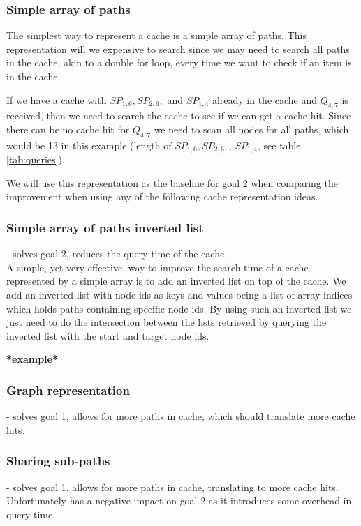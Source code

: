 \subsubsection{Simple array of paths}%
The simplest way to represent a cache is a simple array of paths. This representation will we expensive to search since we may need to search all paths in the cache, akin to a double for loop, every time we want to check if an item is in the cache.

If we have a cache with $SP_{1,6},SP_{2,6},$ and $SP_{1,4}$ already in the cache and $Q_{4,7}$ is received, then we need to search the cache to see if we can get a cache hit. Since there can be no cache hit for $Q_{4,7}$ we need to scan all nodes for all paths, which would be 13 in this example (length of $SP_{1,6},SP_{2,6},$, $SP_{1,4}$, see table \ref{tab:queries}).

We will use this representation as the baseline for goal 2 when comparing the improvement when using any of the following cache representation ideas.

\subsubsection{Simple array of paths inverted list} - solves goal 2, reduces the query time of the cache.\\
A simple, yet very effective, way to improve the search time of a cache represented by a simple array is to add an inverted list on top of the cache. We add an inverted list with node ids as keys and values being a list of array indices which holds paths containing specific node ids. By using such an inverted list we just need to do the intersection between the lists retrieved by querying the inverted list with the start and target node ids. 


\textbf{*example*}

\subsubsection{Graph representation} - solves goal 1, allows for more paths in cache, which should translate more cache hits.

\subsubsection{Sharing sub-paths} - solves goal 1, allows for more paths in cache, translating to more cache hits. Unfortunately has a negative impact on goal 2 as it introduces some overhead in query time.

